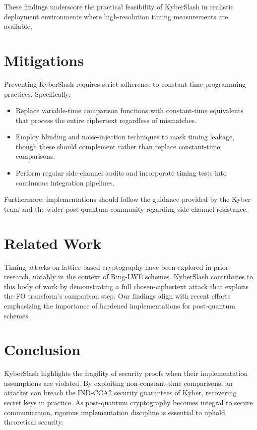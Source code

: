 \documentclass[11pt]{article}
\begin{document}
These findings underscore the practical feasibility of KyberSlash in realistic deployment environments where high-resolution timing measurements are available.

\section{Mitigations}
Preventing KyberSlash requires strict adherence to constant-time programming practices. Specifically:
\begin{itemize}
    \item Replace variable-time comparison functions with constant-time equivalents that process the entire ciphertext regardless of mismatches.
    \item Employ blinding and noise-injection techniques to mask timing leakage, though these should complement rather than replace constant-time comparisons.
    \item Perform regular side-channel audits and incorporate timing tests into continuous integration pipelines.
\end{itemize}

Furthermore, implementations should follow the guidance provided by the Kyber team and the wider post-quantum community regarding side-channel resistance.

\section{Related Work}
Timing attacks on lattice-based cryptography have been explored in prior research, notably in the context of Ring-LWE schemes. KyberSlash contributes to this body of work by demonstrating a full chosen-ciphertext attack that exploits the FO transform's comparison step. Our findings align with recent efforts emphasizing the importance of hardened implementations for post-quantum schemes.

\section{Conclusion}
KyberSlash highlights the fragility of security proofs when their implementation assumptions are violated. By exploiting non-constant-time comparisons, an attacker can breach the IND-CCA2 security guarantees of Kyber, recovering secret keys in practice. As post-quantum cryptography becomes integral to secure communication, rigorous implementation discipline is essential to uphold theoretical security.
\end{document}
